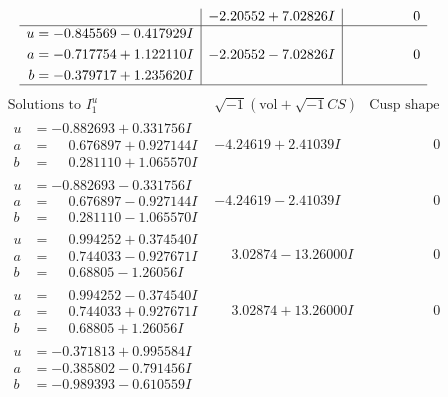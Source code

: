 \documentclass[1p]{elsarticle_modified}
\theoremstyle{definition}
\newcommand{\I}{\sqrt{-1}}
\begin{document}
$$\begin{array}{c|c|c}
 & -2.20552 + 7.02826 I & \phantom{-0.000000 } 0 \\ \hline\begin{aligned}
u &= -0.845569 - 0.417929 I \\
a &= -0.717754 + 1.122110 I \\
b &= -0.379717 + 1.235620 I\end{aligned}
 & -2.20552 - 7.02826 I & \phantom{-0.000000 } 0\\
 \hline 
 \end{array}$$\newpage$$\begin{array}{c|c|c}  
\text{Solutions to }I^u_{1}& \I (\text{vol} + \sqrt{-1}CS) & \text{Cusp shape}\\
 \hline 
\begin{aligned}
u &= -0.882693 + 0.331756 I \\
a &= \phantom{-}0.676897 + 0.927144 I \\
b &= \phantom{-}0.281110 + 1.065570 I\end{aligned}
 & -4.24619 + 2.41039 I & \phantom{-0.000000 } 0 \\ \hline\begin{aligned}
u &= -0.882693 - 0.331756 I \\
a &= \phantom{-}0.676897 - 0.927144 I \\
b &= \phantom{-}0.281110 - 1.065570 I\end{aligned}
 & -4.24619 - 2.41039 I & \phantom{-0.000000 } 0 \\ \hline\begin{aligned}
u &= \phantom{-}0.994252 + 0.374540 I \\
a &= \phantom{-}0.744033 - 0.927671 I \\
b &= \phantom{-}0.68805 - 1.26056 I\end{aligned}
 & \phantom{-}3.02874 - 13.26000 I & \phantom{-0.000000 } 0 \\ \hline\begin{aligned}
u &= \phantom{-}0.994252 - 0.374540 I \\
a &= \phantom{-}0.744033 + 0.927671 I \\
b &= \phantom{-}0.68805 + 1.26056 I\end{aligned}
 & \phantom{-}3.02874 + 13.26000 I & \phantom{-0.000000 } 0 \\ \hline\begin{aligned}
u &= -0.371813 + 0.995584 I \\
a &= -0.385802 - 0.791456 I \\
b &= -0.989393 - 0.610559 I\end{aligned}

\end{array}$$
\end{document}
